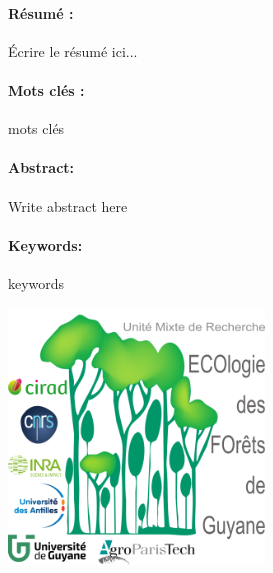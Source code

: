 \newpage
\paragraph{Résumé :}
Écrire le résumé ici...
\paragraph{Mots clés :} mots clés
\newline\newline
\paragraph{Abstract:}
Write abstract here
\paragraph{Keywords:} keywords

\vspace*{\fill}
\includegraphics{images/logo}